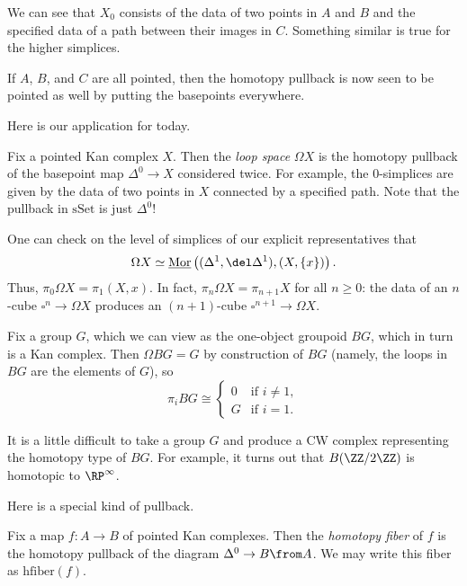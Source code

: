 \documentclass[../notes.tex]{subfiles}
\begin{document}
\begin{example}
	We can see that $X_0$ consists of the data of two points in $A$ and $B$ and the specified data of a path between their images in $C$. Something similar is true for the higher simplices.
\end{example}
\begin{remark}
	If $A$, $B$, and $C$ are all pointed, then the homotopy pullback is now seen to be pointed as well by putting the basepoints everywhere.
\end{remark}
Here is our application for today.
\begin{example}
	Fix a pointed Kan complex $X$. Then the \textit{loop space} $\Omega X$ is the homotopy pullback of the basepoint map $\Delta^0\to X$ considered twice. For example, the $0$-simplices are given by the data of two points in $X$ connected by a specified path. Note that the pullback in $\mathrm{sSet}$ is just $\Delta^0$!
\end{example}
\begin{remark} \label{rem:homotopy-of-omega}
	One can check on the level of simplices of our explicit representatives that
	\[\Omega X\simeq\underline{\mathrm{Mor}}\left((\Delta^1,\del\Delta^1),(X,\{x\})\right).\]
	Thus, $\pi_0\Omega X=\pi_1(X,x)$. In fact, $\pi_n\Omega X=\pi_{n+1}X$ for all $n\ge0$: the data of an $n$-cube $\square^n\to\Omega X$ produces an $(n+1)$-cube $\square^{n+1}\to\Omega X$. 
\end{remark}
\begin{example}
	Fix a group $G$, which we can view as the one-object groupoid $BG$, which in turn is a Kan complex. Then $\Omega BG=G$ by construction of $BG$ (namely, the loops in $BG$ are the elements of $G$), so
	\[\pi_iBG\cong\begin{cases}
		0 & \text{if }i\ne1, \\
		G & \text{if }i=1.
	\end{cases}\]
\end{example}
\begin{remark}
	It is a little difficult to take a group $G$ and produce a CW complex representing the homotopy type of $BG$. For example, it turns out that $B(\ZZ/2\ZZ)$ is homotopic to $\RP^\infty$.
\end{remark}
Here is a special kind of pullback.
\begin{definition}
	Fix a map $f\colon A\to B$ of pointed Kan complexes. Then the \textit{homotopy fiber} of $f$ is the homotopy pullback of the diagram $\Delta^0\to B\from A$. We may write this fiber as $\mathrm{hfiber}(f)$.
\end{definition}
\end{document}
